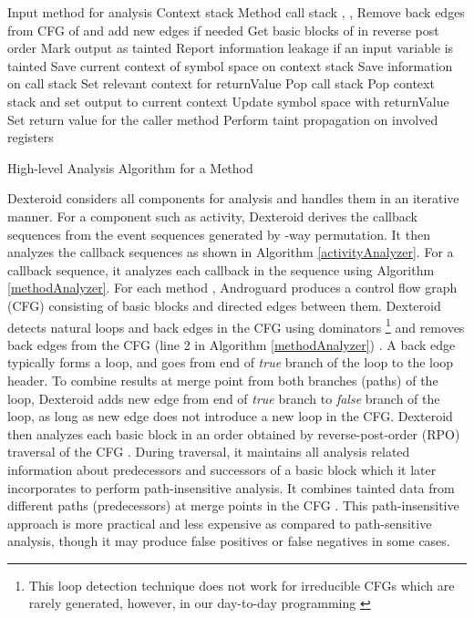 \documentclass[10pt]{elsarticle}
\begin{document}
 \begin{algorithm}
\begin{algorithmic}[1]
\INPUT
\Statex  \Comment Input method for analysis
\Statex   \Comment Context stack
\Statex   \Comment Method call stack
 {, , }
	\State Remove back edges from CFG of  and add new edges if needed
	\State  Get basic blocks of  in reverse post order\;
				\State Mark output as tainted
				\State Report information leakage if an input variable is tainted
				\State Save current context of symbol space on context stack 
				\State Save  information on call stack 
				\State Set relevant context for 
				\State returnValue {}
				\State Pop call stack 
				\State Pop context stack  and set output to current context
				\State Update symbol space with returnValue
				\State Set return value for the caller method
			\Else
				\State Perform taint propagation on involved registers
			\EndIf
		\EndFor		
	\EndFor	
\EndProcedure
\end{algorithmic}
\caption{High-level Analysis Algorithm for a Method }\label{methodAnalyzer}
\end{algorithm}


Dexteroid considers all components for analysis and handles them in an iterative manner. For a component such as activity, Dexteroid derives the callback sequences from the event sequences generated by -way permutation. It then analyzes the callback sequences as shown in Algorithm \ref{activityAnalyzer}. For a callback sequence, it analyzes each callback in the sequence using Algorithm \ref{methodAnalyzer}. For each method , Androguard \cite{Androguard} produces a control flow graph (CFG) consisting of basic blocks and directed edges between them. Dexteroid detects natural loops and back edges in the CFG using dominators \footnote{This loop detection technique does not work for irreducible CFGs which are rarely generated, however, in our day-to-day programming \cite{AhoCompilers}} \cite{AhoCompilers} and removes back edges from the CFG (line 2 in Algorithm \ref{methodAnalyzer}) . A back edge typically forms a loop, and goes from end of \emph{true} branch of the loop to the loop header. To combine results at merge point from both branches (paths) of the loop, Dexteroid adds new edge from end of \emph{true} branch to \emph{false} branch of the loop, as long as new edge does not introduce a new loop in the CFG. Dexteroid then analyzes each basic block in an order obtained by reverse-post-order (RPO) traversal of the CFG \cite{RPOTraversal}. During traversal, it maintains all analysis related information about predecessors and successors of a basic block which it later incorporates to perform path-insensitive analysis. It combines tainted data from different paths (predecessors) at merge points in the CFG \cite{staticAnalysis}. This path-insensitive approach is more practical and less expensive as compared to path-sensitive analysis, though it may produce false positives or false negatives in some cases.
\end{document}
